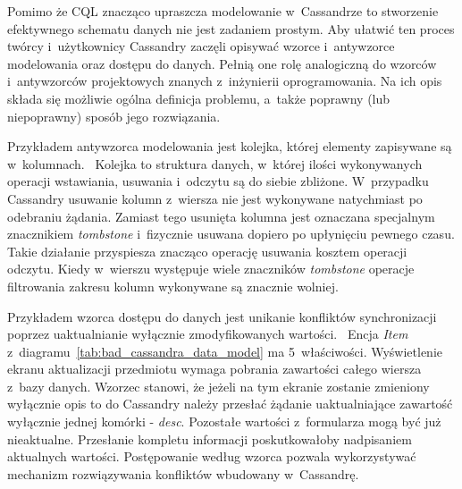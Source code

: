 Pomimo że CQL znacząco upraszcza modelowanie w~Cassandrze to stworzenie efektywnego schematu danych nie jest zadaniem prostym. Aby ułatwić ten proces twórcy i~użytkownicy Cassandry zaczęli opisywać wzorce i~antywzorce modelowania oraz dostępu do danych. Pełnią one rolę analogiczną do wzorców i~antywzorców projektowych znanych z~inżynierii oprogramowania. Na ich opis składa się możliwie ogólna definicja problemu, a~także poprawny (lub niepoprawny) sposób jego rozwiązania. 

Przykładem antywzorca modelowania jest kolejka, której elementy zapisywane są w~kolumnach.~\cite{cassandra_queue_antipattern} Kolejka to struktura danych, w~której ilości wykonywanych operacji wstawiania, usuwania i~odczytu są do siebie zbliżone. W~przypadku Cassandry usuwanie kolumn z~wiersza nie jest wykonywane natychmiast po odebraniu żądania. Zamiast tego usunięta kolumna jest oznaczana specjalnym znacznikiem \emph{tombstone} i~fizycznie usuwana dopiero po upłynięciu pewnego czasu. Takie działanie przyspiesza znacząco operację usuwania kosztem operacji odczytu. Kiedy w~wierszu występuje wiele znaczników \emph{tombstone} operacje filtrowania zakresu kolumn wykonywane są znacznie wolniej.

Przykładem wzorca dostępu do danych jest unikanie konfliktów synchronizacji poprzez uaktualnianie wyłącznie zmodyfikowanych wartości.~\cite{cassandra_concepts_patterns_antipatterns} Encja \emph{Item} z~diagramu~\ref{tab:bad_cassandra_data_model} ma 5~właściwości. Wyświetlenie ekranu aktualizacji przedmiotu wymaga pobrania zawartości całego wiersza z~bazy danych. Wzorzec stanowi, że jeżeli na tym ekranie zostanie zmieniony wyłącznie opis to do Cassandry należy przesłać żądanie uaktualniające zawartość wyłącznie jednej komórki - \emph{desc}. Pozostałe wartości z~formularza mogą być już nieaktualne. Przesłanie kompletu informacji poskutkowałoby nadpisaniem aktualnych wartości. Postępowanie według wzorca pozwala wykorzystywać mechanizm rozwiązywania konfliktów wbudowany w~Cassandrę.


